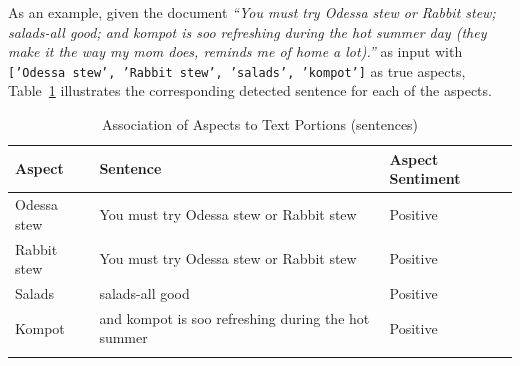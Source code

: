 As an example, given the document \textit{``You must try Odessa stew or Rabbit stew; salads-all good; and kompot is soo refreshing during the hot summer day (they make it the way my mom does, reminds me of home a lot).''} as input with \texttt{['Odessa stew', 'Rabbit stew', 'salads', 'kompot']} as true aspects, Table~\ref{tab:aspect_to_sentence} illustrates the corresponding detected sentence for each of the aspects.

\begin{table}[h]
\caption{Association of Aspects to Text Portions (sentences)}\label{tab:aspect_to_sentence}%
\begin{tabular*}{\textwidth}{@{\extracolsep{\fill}}lll}
\toprule
Aspect & Sentence & Aspect Sentiment \\
\midrule
Odessa stew & You must try Odessa stew or Rabbit stew & Positive \\
Rabbit stew & You must try Odessa stew or Rabbit stew & Positive \\
Salads & salads-all good & Positive \\
Kompot & and kompot is soo refreshing during the hot summer & Positive \\
\botrule
\end{tabular*}
\end{table}